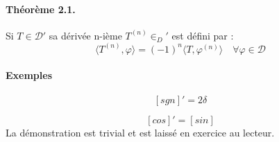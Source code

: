 \documentclass[12pt,a4paper]{report}
\newcommand{\fphi}{\quad \forall \varphi \in \mathcal{D}}
\newcommand{\D}{\ensuremath{\mathcal{D}}}
\begin{document}
\paragraph{Théorème 2.1.} Si \(T \in \D'\) sa dérivée n-ième \(T^{(n)} \in _D'\) est défini par :
\[
	\langle T^{(n)}, \varphi \rangle = (-1)^{n} \langle T, \varphi^{(n)} \rangle \fphi
\]

\paragraph{Exemples} \quad \par 

\[
	[sgn]' = 2\delta
\]

\[
	[cos]' = [sin]
\]
La démonstration est trivial et est laissé en exercice au lecteur.
\end{document}
